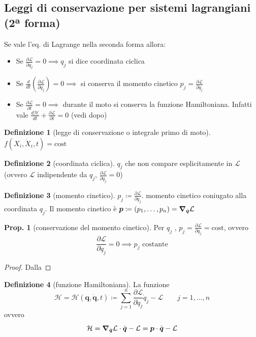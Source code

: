 \documentclass[a4paper,10pt]{article}
\theoremstyle{definition}
\newcommand{\bv}{\boldsymbol} %
\theoremstyle{indentdefinition}
\newtheorem{defn}{Definizione}[section]
\theoremstyle{indenttheorem}
\newtheorem{prop}{Prop.}
\theoremstyle{myremark}
\theoremstyle{indentgeneral}
\begin{document}
\subsection{Leggi di conservazione per sistemi lagrangiani (2ª forma)}
Se vale l'eq. di Lagrange nella seconda forma allora:
\begin{itemize}
    \item Se $\frac{\partial\mathcal{L}}{\partial q_{j}}=0\implies q_j$ si dice coordinata ciclica
    \item Se $\frac{d}{dt}\left(\frac{\partial\mathcal{L}}{\partial\dot{q}_{j}}\right)=0 \implies$  si conserva il momento cinetico $p_j=\frac{\partial\mathcal{L}}{\partial\dot{q}_{j}}$
    \item Se $\frac{\partial \mathcal{L}}{\partial t}=0\implies$ durante il moto si conserva la funzione Hamiltoniana. Infatti vale  $\frac{d\mathcal{H}}{dt}+\frac{\partial\mathcal{L}}{\partial t}=0$ (vedi dopo)
\end{itemize}
\begin{defn}[legge di conservazione o integrale primo di moto]
\label{def:legge-di-conservazione}$f\left(X_{i},\dot{X}_{i},t\right)=\text{cost}$
\end{defn}

\begin{defn}[coordinata ciclica]
\label{def:coordinata-ciclica}$q_{j}$ che non compare esplicitamente
in $\mathcal{L}$ (ovvero $\mathcal{L}$ indipendente da $q_{j}$,
$\frac{\partial\mathcal{L}}{\partial q_{j}}=0$)
\end{defn}

\begin{defn}[momento cinetico]
\label{def:momento-cinetico}$p_{j}\coloneqq\frac{\partial\mathcal{L}}{\partial\dot{q}_{j}}$. 
momento cinetico coniugato alla coordinata $q_{j}$. Il momento cinetico è $\bv{p}\coloneqq (p_1,\dots,p_n)=\grad_{\dot{\bv{q}}}\mathcal{L}$
\end{defn}

\begin{prop}[conservazione del momento cinetico]
\label{prop:conservazione-momento-cinetico}Per $q_{j}$ ,
$p_{j}=\frac{\partial\mathcal{L}}{\partial\dot{q}_{j}}=\text{cost}$, ovvero
$$\frac{\partial\mathcal{L}}{\partial q_{j}}=0\implies p_{j} \text{ costante}$$
\end{prop}

\begin{proof}
Dalla 
\end{proof}
\begin{defn}[funzione Hamiltoniana]
\label{def:funzione-Hamiltoniana} La funzione
$$\mathcal{H}=\mathcal{H}\left(\bv{q},\dot{\bv{q}},t\right)\coloneqq\sum_{j=1}^{n}\frac{\partial\mathcal{L}}{\partial\dot{q}_{j}}\dot{q}_{j}-\mathcal{L} \quad\quad j=1,\dots,n$$
ovvero 
$$\mathcal{H}=\grad_{\dot{\bv{q}}}\mathcal{L}\cdot\dot{\bv{q}}-\mathcal{L}=\bv{p}\cdot\dot{\bv{q}}-\mathcal{L}$$
\end{defn}
\end{document}
